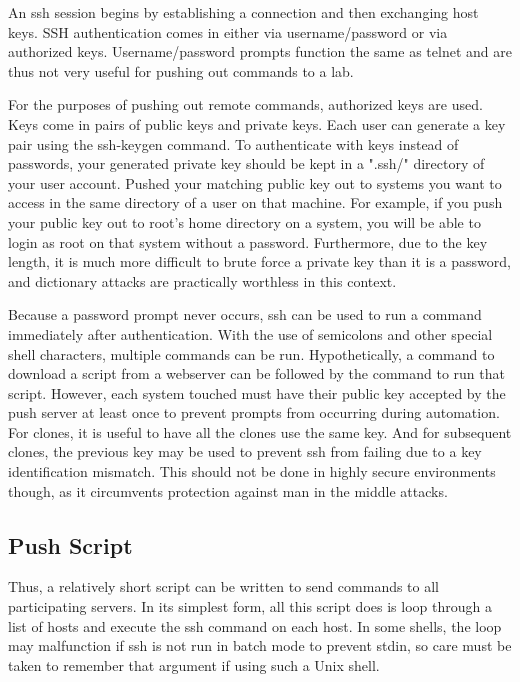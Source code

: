 An ssh session begins by establishing a connection and then exchanging host keys.  SSH authentication comes in either via username/password or via authorized keys.  Username/password prompts function the same as telnet and are thus not very useful for pushing out commands to a lab.

For the purposes of pushing out remote commands, authorized keys are used.  Keys come in pairs of public keys and private keys.  Each user can generate a key pair using the ssh-keygen command.  To authenticate with keys instead of passwords, your generated private key should be kept in a ".ssh/" directory of your user account.  Pushed your matching public key out to systems you want to access in the same directory of a user on that machine.  For example, if you push your public key out to root's home directory on a system, you will be able to login as root on that system without a password.  Furthermore, due to the key length, it is much more difficult to brute force a private key than it is a password, and dictionary attacks are practically worthless in this context.  

Because a password prompt never occurs, ssh can be used to run a command immediately after authentication.  With the use of semicolons and other special shell characters, multiple commands can be run.  Hypothetically, a command to download a script from a webserver can be followed by the command to run that script.  However, each system touched must have their public key accepted by the push server at least once to prevent prompts from occurring during automation.  For clones, it is useful to have all the clones use the same key.  And for subsequent clones, the previous key may be used to prevent ssh from failing due to a key identification mismatch.  This should not be done in highly secure environments though, as it circumvents protection against man in the middle attacks.  
\subsection{Push Script}
Thus, a relatively short script can be written to send commands to all participating servers.  In its simplest form, all this script does is loop through a list of hosts and execute the ssh command on each host.  In some shells, the loop may malfunction if ssh is not run in batch mode to prevent stdin, so care must be taken to remember that argument if using such a Unix shell.  

